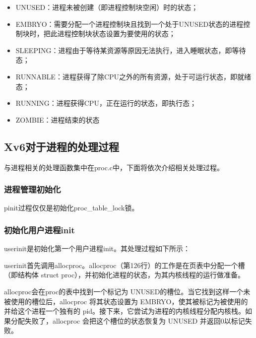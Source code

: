 \begin{itemize}
\item UNUSED：进程未被创建（即进程控制块空闲）时的状态；
\item EMBRYO：需要分配一个进程控制块且找到一个处于UNUSED状态的进程控制块时，把此进程控制块状态设置为要使用的状态；
\item SLEEPING：进程由于等待某资源等原因无法执行，进入睡眠状态，即等待态；
\item RUNNABLE：进程获得了除CPU之外的所有资源，处于可运行状态，即就绪态；
\item RUNNING：进程获得CPU，正在运行的状态，即执行态；
\item ZOMBIE：进程结束的状态
\end{itemize}

\subsection{Xv6对于进程的处理过程}

与进程相关的处理函数集中在proc.c中，下面将依次介绍相关处理过程。

\subsubsection{进程管理初始化}

pinit过程仅仅是初始化proc\_table\_lock锁。

\subsubsection{初始化用户进程init}

userinit是初始化第一个用户进程init。其处理过程如下所示：

userinit首先调用allocproc。allocproc（第126行）的工作是在页表中分配一个槽（即结构体 struct proc），并初始化进程的状态，为其内核线程的运行做准备。

allocproc会在proc的表中找到一个标记为 UNUSED的槽位。当它找到这样一个未被使用的槽位后，allocproc 将其状态设置为 EMBRYO，使其被标记为被使用的并给这个进程一个独有的 pid。接下来，它尝试为进程的内核线程分配内核栈。如果分配失败了，allocproc 会把这个槽位的状态恢复为 UNUSED 并返回0以标记失败。

